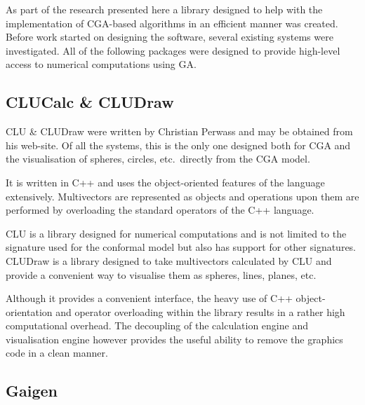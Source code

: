 As part of the research presented here a library designed to help with the
implementation of CGA-based algorithms in an efficient manner was created.
Before work started on designing the software, several existing systems were
investigated. All of the following packages were designed to provide
high-level access to numerical computations using GA.

\subsection{CLUCalc \& CLUDraw}


CLU \& CLUDraw were written by Christian Perwass and may be obtained from his
web-site\cite{CLU}. Of all the systems, this
is the only one designed both for CGA and the visualisation of spheres,
circles, etc.\ directly from the CGA model.

It is written in C++ and uses the object-oriented features of the language
extensively. Multivectors are represented as objects and operations upon
them are performed by overloading the standard operators of the C++
language. 

CLU is a library designed for numerical computations and is not limited
to the signature used for the conformal model but also has support for
other signatures. CLUDraw is a library designed to take multivectors calculated
by CLU and provide a convenient way to visualise them as spheres, lines, planes,
etc. 

Although it provides a convenient interface, the heavy use of C++ object-orientation
and operator overloading within the library results in a rather high
computational overhead. The decoupling of the calculation engine and
visualisation engine however provides the useful ability to remove the
graphics code in a clean manner.


%

\subsection{Gaigen}

